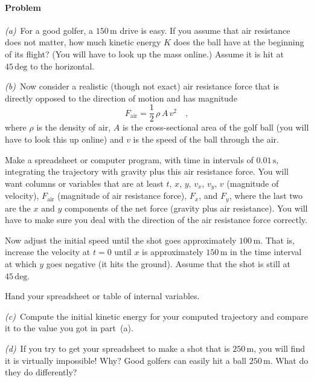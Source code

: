 \documentclass[12pt]{article}
\newcommand{\s}{\mathrm{s}}
\renewcommand{\deg}{\mathrm{deg}}
\newcommand{\m}{\mathrm{m}}
\newcounter{problem}
\begin{document}
\paragraph{Problem~\theproblem}%
\textsl{(a)}~For a good golfer, a $150\,\m$ drive is easy.  If you
assume that air resistance does not matter, how much kinetic energy
$K$ does the ball have at the beginning of its flight?  (You will have
to look up the mass online.)  Assume it is hit at $45\,\deg$ to the
horizontal.

\textsl{(b)}~Now consider a realistic (though not exact) air
resistance force that is directly opposed to the direction of motion
and has magnitude
\begin{equation}
F_\mathrm{air} = \frac{1}{2}\,\rho\,A\,v^2 \quad ,
\end{equation}
where $\rho$ is the density of air, $A$ is the cross-sectional area of
the golf ball (you will have to look this up online) and $v$ is the
speed of the ball through the air.

Make a spreadsheet or computer program, with time in intervals of
$0.01\,\s$, integrating the trajectory with gravity plus this air
resistance force.  You will want columns or variables that are at
least $t$, $x$, $y$, $v_x$, $v_y$, $v$ (magnitude of velocity),
$F_\mathrm{air}$ (magnitude of air resistance force), $F_x$, and
$F_y$, where the last two are the $x$ and $y$ components of the net
force (gravity plus air resistance).  You will have to make sure you
deal with the direction of the air resistance force correctly.

Now adjust the initial speed until the shot goes approximately
$100\,\m$.  That is, increase the velocity at $t=0$ until $x$ is
approximately $150\,\m$ in the time interval at which $y$ goes
negative (it hits the ground).  Assume that the shot is still at
$45\,\deg$.

Hand your spreadsheet or table of internal variables.

\textsl{(c)}~Compute the initial kinetic energy for your computed
trajectory and compare it to the value you got in part~(a).

\textsl{(d)}~If you try to get your spreadsheet to make a shot that is
$250\,\m$, you will find it is virtually impossible!  Why?  Good
golfers can easily hit a ball $250\,\m$.  What do they do differently?
\end{document}
